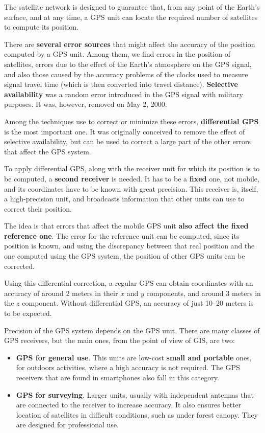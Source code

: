The satellite network is designed to guarantee that, from any point of the Earth's surface, and at any time, a GPS unit can locate the required number of satellites to compute its position.

There are \textbf{several error sources} that might affect the accuracy of the position computed by a GPS unit. Among them, we find errors in the position of satellites, errors due to the effect of the Earth's atmosphere on the GPS signal, and also those caused by the accuracy problems of the clocks used to measure signal travel time (which is then converted into travel distance). \textbf{Selective availability} was a random error introduced in the GPS signal with military purposes. It was, however, removed on May 2, 2000.

Among the techniques use to correct or minimize these errors, \textbf{differential GPS} is the most important one. It was originally conceived to remove the effect of selective availability, but can be used to correct a large part of the other errors that affect the GPS system.

To apply differential GPS, along with the receiver unit for which its position is to be computed, a \textbf{second receiver} is needed. It has to be a \textbf{fixed} one, not mobile, and its coordinates have to be known with great precision. This receiver is, itself, a high-precision unit, and broadcasts information that other units can use to correct their position. 

The idea is that errors that affect the mobile GPS unit \textbf{also affect the fixed reference one}. The error for the reference unit can be computed, since its position is known, and using the discrepancy between that real position and the one computed using the GPS system, the position of other GPS units can be corrected.

Using this differential correction, a regular GPS can obtain coordinates with an accuracy of around 2 meters in their $x$ and $y$ components, and around 3 meters in the $z$ component. Without differential GPS, an accuracy of just 10--20 meters is to be expected.

Precision of the GPS system depends on the GPS unit. There are many classes of GPS receivers, but the main ones, from the point of view of GIS, are two:

\begin{itemize}
	\item \textbf{GPS for general use}. This units are low-cost \textbf{small and portable} ones, for outdoors activities, where a high accuracy is not required. The GPS receivers that are found in smartphones also fall in this category.
	\item \textbf{GPS for surveying}. Larger units, usually with independent antennas that are connected to the receiver to increase accuracy. It also ensures better location of satellites in difficult conditions, such as under forest canopy. They are designed for professional use.
\end{itemize}	


